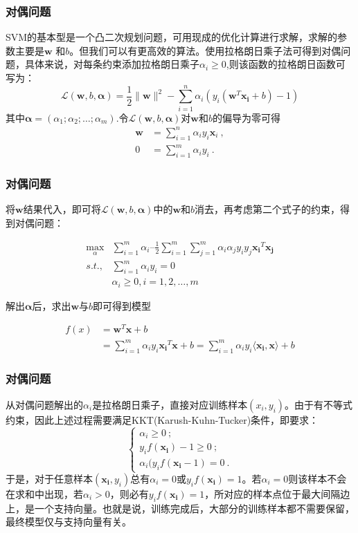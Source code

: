 \begin{frame}
\frametitle{对偶问题}
SVM的基本型是一个凸二次规划问题，可用现成的优化计算进行求解，求解的参数主要是$\boldsymbol{w}$ 和$b$。但我们可以有更高效的算法。使用拉格朗日乘子法可得到对偶问题，具体来说，对每条约束添加拉格朗日乘子$\alpha_i \ge0$,则该函数的拉格朗日函数可写为：
\[
\mathcal{L}(\boldsymbol{w},b,\boldsymbol{\alpha})=\frac{1}{2}\|\boldsymbol{w}\|^2-\sum_{i=1}^n\alpha_i \left(y_i(\boldsymbol{w}^T\boldsymbol{x_i}+b)-1\right)
\]
其中$\boldsymbol{\alpha} = (\alpha_1;\alpha_2;\dots;\alpha_m)$.令$\mathcal{L}(\boldsymbol{w},b,\boldsymbol{\alpha})$对$\boldsymbol{w}$和$b$的偏导为零可得
\begin{align*}
\boldsymbol{w} &= \sum_{i=1}^n\alpha_i y_i \boldsymbol{x}_i\ ,\\
0&=\sum_{i=1}^m\alpha_iy_i\ .
\end{align*}

\end{frame}


\begin{frame}

\frametitle{对偶问题}

将$\boldsymbol{w}$结果代入，即可将$\mathcal{L}(\boldsymbol{w},b,\boldsymbol{\alpha})$中的$\boldsymbol{w}$和$b$消去，再考虑第二个式子的约束，得到对偶问题：

\begin{align*}
 \max_\alpha &\sum_{i=1}^m\alpha_i – \frac{1}{2}\sum_{i=1}^m\sum_{j=1}^m\alpha_i\alpha_jy_iy_j\boldsymbol{x_i}^T\boldsymbol{x_j} \\ 
 s.t.,&\sum_{i=1}^m\alpha_iy_i = 0 \\
  &\alpha_i\geq 0, i=1,2,\ldots,m
 \end{align*}

解出$\boldsymbol{\alpha}$后，求出$\boldsymbol{w}$与$b$即可得到模型

\begin{align*}
f(x)&=\boldsymbol{w}^T\boldsymbol{x}+b\\
&=\sum_{i=1}^m\alpha_i y_i \boldsymbol{x_i}^T\boldsymbol{x}+b 
= \sum_{i=1}^m\alpha_i y_i \langle\boldsymbol{x_i, x}\rangle + b
\end{align*}

\end{frame}


\begin{frame}

\frametitle{对偶问题}
从对偶问题解出的$\alpha_i$是拉格朗日乘子，直接对应训练样本$(x_i,y_i)$。由于有不等式约束，因此上述过程需要满足KKT(Karush-Kuhn-Tucker)条件，即要求：
\[ 
\begin{cases}
\alpha_i \geq0\ ; \\
y_if(\boldsymbol{x_i})-1\geq 0\ ;\\
\alpha_i(y_if(\boldsymbol{x_i}-1)=0\ .
\end{cases} 
\]
于是，对于任意样本$(\boldsymbol{x_i},y_i)$总有$\alpha_i = 0$或$y_if(\boldsymbol{x_i})=1$。若$\alpha_i = 0$则该样本不会在求和中出现，若$\alpha_i > 0$，则必有$y_if(\boldsymbol{x_i})=1$，所对应的样本点位于最大间隔边上，是一个支持向量。也就是说，训练完成后，大部分的训练样本都不需要保留，最终模型仅与支持向量有关。
\end{frame}


